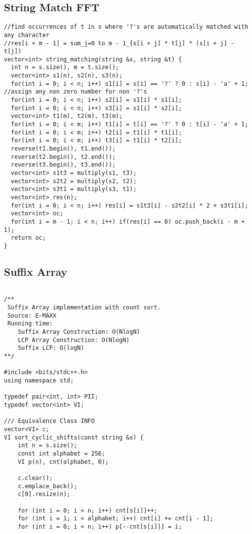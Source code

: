 \documentclass[FSZ,a4paper,onesided]{article}
\begin{document}
\begin{multicols*}{\COLS}
\subsection{String Match FFT}
\begin{lstlisting}
//find occurrences of t in s where '?'s are automatically matched with any character
//res[i + m - 1] = sum_j=0 to m - 1_{s[i + j] * t[j] * (s[i + j] - t[j])
vector<int> string_matching(string &s, string &t) {
  int n = s.size(), m = t.size();
  vector<int> s1(n), s2(n), s3(n);
  for(int i = 0; i < n; i++) s1[i] = s[i] == '?' ? 0 : s[i] - 'a' + 1; //assign any non zero number for non '?'s
  for(int i = 0; i < n; i++) s2[i] = s1[i] * s1[i];
  for(int i = 0; i < n; i++) s3[i] = s1[i] * s2[i];
  vector<int> t1(m), t2(m), t3(m);
  for(int i = 0; i < m; i++) t1[i] = t[i] == '?' ? 0 : t[i] - 'a' + 1;
  for(int i = 0; i < m; i++) t2[i] = t1[i] * t1[i];
  for(int i = 0; i < m; i++) t3[i] = t1[i] * t2[i];
  reverse(t1.begin(), t1.end());
  reverse(t2.begin(), t2.end());
  reverse(t3.begin(), t3.end());
  vector<int> s1t3 = multiply(s1, t3);
  vector<int> s2t2 = multiply(s2, t2);
  vector<int> s3t1 = multiply(s3, t1);
  vector<int> res(n);
  for(int i = 0; i < n; i++) res[i] = s1t3[i] - s2t2[i] * 2 + s3t1[i];
  vector<int> oc;
  for(int i = m - 1; i < n; i++) if(res[i] == 0) oc.push_back(i - m + 1);
  return oc;
}
\end{lstlisting}
\subsection{Suffix Array}
\begin{lstlisting}

/**
 Suffix Array implementation with count sort.
 Source: E-MAXX
 Running time:
    Suffix Array Construction: O(NlogN)
    LCP Array Construction: O(NlogN)
    Suffix LCP: O(logN)
**/

#include <bits/stdc++.h>
using namespace std;

typedef pair<int, int> PII;
typedef vector<int> VI;

/// Equivalence Class INFO
vector<VI> c;
VI sort_cyclic_shifts(const string &s) {
    int n = s.size();
    const int alphabet = 256;
    VI p(n), cnt(alphabet, 0);

    c.clear();
    c.emplace_back();
    c[0].resize(n);

    for (int i = 0; i < n; i++) cnt[s[i]]++;
    for (int i = 1; i < alphabet; i++) cnt[i] += cnt[i - 1];
    for (int i = 0; i < n; i++) p[--cnt[s[i]]] = i;


\end{lstlisting}
\end{multicols*}
\end{document}
